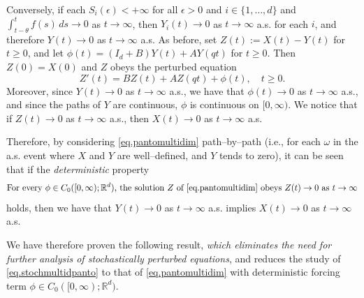 \documentclass[a4paper,10pt,reqno]{amsart}
\numberwithin{equation}{section}
\theoremstyle{definition}
\theoremstyle{remark}
\DeclareMathOperator{\1}{\mathbbm 1}
\begin{document}
Conversely, if each $S_i(\epsilon)<+\infty$ for all $\epsilon>0$ and $i\in \{1,\ldots,d\}$ and $\int_{t-\theta}^t f(s)\,ds\to 0$ as $t\to\infty$, then $Y_i(t)\to 0$ as $t\to\infty$ a.s. for each $i$, and therefore $Y(t)\to 0$ as $t\to\infty$ a.s. As before, set $Z(t):=X(t)-Y(t)$ for $t\geq 0$, and let $\phi(t)=(I_d+B)Y(t)+AY(qt)$ for $t\geq 0$. Then $Z(0)=X(0)$ and $Z$ obeys the perturbed equation 
\begin{equation} \label{eq.pantomultidim}
Z'(t)=BZ(t)+AZ(qt)+\phi(t), \quad t\geq 0.
\end{equation}
Moreover, since $Y(t)\to 0$ as $t\to\infty$ a.s., we have that $\phi(t)\to 0$ as $t\to\infty$ a.s., and since the paths of $Y$ are continuous, $\phi$ is continuous on $[0,\infty)$. We notice that if $Z(t)\to 0$ as $t\to\infty$ a.s., then $X(t)\to 0$ as $t\to\infty$ a.s. 

Therefore, by considering \eqref{eq.pantomultidim} path--by--path (i.e., for each $\omega$ in the a.s. event where $X$ and $Y$ are well--defined, and $Y$ tends to zero), it can be seen that if the \textit{deterministic} property 
\begin{equation} \label{eq.perturbedpropertymultid}
\text{For every $\phi\in C_0([0,\infty);\mathbb{R}^d)$, the solution $Z$ of \eqref{eq.pantomultidim} obeys $Z(t)\to 0$ as $t\to\infty$}
\end{equation}
holds,  
then we have that $Y(t)\to 0$ as $t\to\infty$ a.s. implies $X(t)\to 0$ as $t\to\infty$ a.s. 

We have therefore proven the following result, \textit{which eliminates the need for further analysis of stochastically perturbed equations}, and reduces the study of \eqref{eq.stochmultidpanto} to that of  \eqref{eq.pantomultidim} with deterministic forcing term $\phi\in C_0([0,\infty);\mathbb{R}^d)
$.
\end{document}
